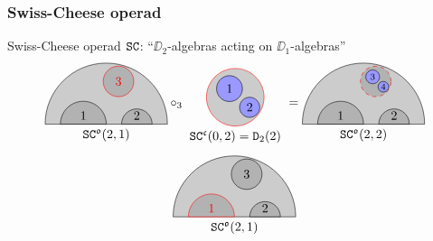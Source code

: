 \documentclass{beamer}
\begin{document}
\begin{frame}
  \frametitle{Swiss-Cheese operad}
  Swiss-Cheese operad $\mathtt{SC}$: ``$\DD_{2}$-algebras acting on $\DD_{1}$-algebras''
  \pause
  \begin{equation*}
    \begin{tikzpicture}[scale=0.85, baseline=5mm]
      \filldraw[fill=gray!40] (-2,0) -- (2,0) arc (0:180:2);
      \filldraw[fill=gray!60] (-1.5,0) -- (0,0) node[above,midway]{$1$} arc (0:180:0.75);
      \filldraw[fill=gray!60] (0.5,0) -- (1.5,0) node[above,midway]{$2$} arc (0:180:0.5);
      \filldraw[red,fill=gray!60] (0.4,1.4) circle (0.5) node{$3$};
      \draw (0,0) node[below] {$\SC^{\col o}(2,1)$};
    \end{tikzpicture}
    \circ_{3}
    \begin{tikzpicture}[scale=0.4, baseline=-2.5mm]
      \filldraw[red,fill=gray!40] (0,0) circle (2);
      \filldraw[fill=blue!40] (-0.4,0.6) circle (0.9) node{$1$};
      \filldraw[fill=blue!40] (1, -0.7) circle (0.7) node{$2$};
      \draw (0,-2) node[below] {$\SC^{\col c}(0,2) = \DD_{2}(2)$};
    \end{tikzpicture}
    =
    \begin{tikzpicture}[scale=0.85, baseline=5mm]
      \filldraw[fill=gray!40] (-2,0) -- (2,0) arc (0:180:2);
      \filldraw[fill=gray!60] (-1.5,0) -- (0,0) node[above,midway]{$1$} arc (0:180:0.75);
      \filldraw[fill=gray!60] (0.5,0) -- (1.5,0) node[above,midway]{$2$} arc (0:180:0.5);
      \filldraw[red,dashed,fill=gray!60] (0.4,1.4) circle (0.5);
      \begin{scope}[shift={(0.4,1.4)}, scale=0.25]
        \filldraw[fill=blue!40] (-0.4,0.6) circle (0.9) node{$\scriptstyle 3$};
        \filldraw[fill=blue!40] (1, -0.7) circle (0.7) node{$\scriptstyle 4$};
      \end{scope}
      \draw (0,0) node[below] {$\SC^{\col o}(2,2)$};
    \end{tikzpicture}
  \end{equation*}
  \pause
  \begin{equation*}
    \begin{tikzpicture}[scale=0.85, baseline=5mm]
      \filldraw[fill=gray!40] (-2,0) -- (2,0) arc (0:180:2);
      \filldraw[red,fill=gray!60] (-1.5,0) -- (0,0) node[above,midway]{$1$} arc (0:180:0.75);
      \filldraw[fill=gray!60] (0.5,0) -- (1.5,0) node[above,midway]{$2$} arc (0:180:0.5);
      \filldraw[fill=gray!60] (0.4,1.4) circle (0.5) node{$3$};
      \draw (0,0) node[below] {$\SC^{\col o}(2,1)$};
    \end{tikzpicture}

\end{equation*}
\end{frame}
\end{document}
